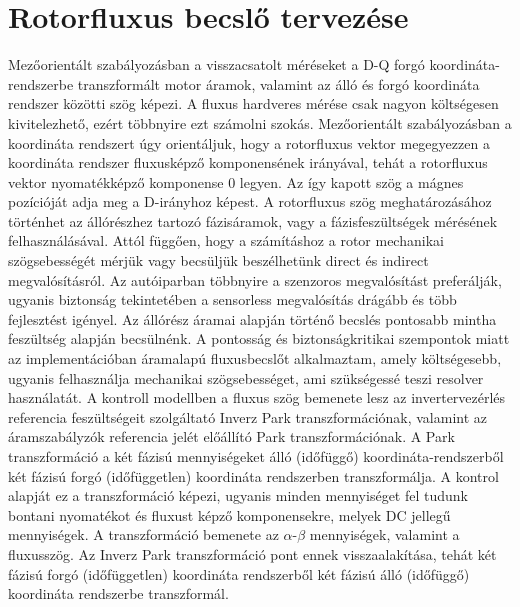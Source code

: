 \documentclass[a4paper,12pt]{article}
\begin{document}
	\section{Rotorfluxus becslő tervezése}
	
		Mezőorientált szabályozásban a visszacsatolt méréseket a D-Q forgó koordináta-rendszerbe transzformált motor áramok, valamint az álló és forgó koordináta rendszer közötti szög képezi. A fluxus hardveres mérése csak nagyon költségesen kivitelezhető, ezért többnyire ezt számolni szokás. Mezőorientált szabályozásban a koordináta rendszert úgy  orientáljuk, hogy a rotorfluxus vektor megegyezzen a koordináta rendszer fluxusképző komponensének irányával, tehát a rotorfluxus vektor nyomatékképző komponense 0 legyen. Az így kapott szög a mágnes pozícióját adja meg a  D-irányhoz képest. A rotorfluxus szög meghatározásához történhet az állórészhez tartozó fázisáramok, vagy a fázisfeszültségek mérésének felhasználásával. Attól függően, hogy a számításhoz a rotor mechanikai szögsebességét mérjük vagy becsüljük beszélhetünk direct és indirect megvalósításról. Az autóiparban többnyire a szenzoros megvalósítást preferálják, ugyanis biztonság tekintetében a sensorless megvalósítás drágább és több fejlesztést igényel. Az állórész áramai alapján történő becslés pontosabb mintha feszültség alapján becsülnénk. A pontosság és biztonságkritikai szempontok miatt az implementációban áramalapú fluxusbecslőt alkalmaztam, amely költségesebb, ugyanis felhasználja mechanikai szögsebességet, ami szükségessé teszi resolver használatát. A kontroll modellben a fluxus szög bemenete lesz az invertervezérlés referencia feszültségeit szolgáltató Inverz Park transzformációnak, valamint az áramszabályzók referencia jelét előállító Park transzformációnak. A Park transzformáció a két fázisú mennyiségeket álló (időfüggő) koordináta-rendszerből két fázisú forgó (időfüggetlen) koordináta rendszerben transzformálja. A kontrol alapját ez a transzformáció képezi, ugyanis minden mennyiséget fel tudunk bontani nyomatékot és fluxust képző komponensekre, melyek DC jellegű mennyiségek. A transzformáció bemenete az $\alpha$-$\beta$ mennyiségek, valamint a fluxusszög. Az Inverz Park transzformáció pont ennek visszaalakítása, tehát két fázisú forgó (időfüggetlen) koordináta rendszerből két fázisú álló (időfüggő) koordináta rendszerbe transzformál.
		
\end{document}

